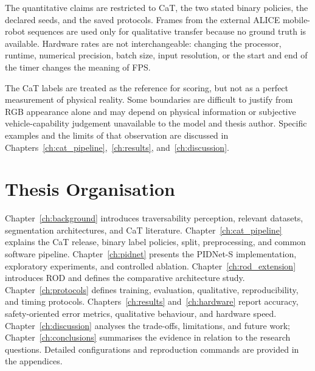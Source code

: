 The quantitative claims are restricted to CaT, the two stated binary policies,
the declared seeds, and the saved protocols. Frames from the external ALICE
mobile-robot sequences are used only for qualitative transfer because no
ground truth is available. Hardware rates are not interchangeable: changing
the processor, runtime, numerical precision, batch size, input resolution, or
the start and end of the timer changes the meaning of FPS.

The CaT labels are treated as the reference for scoring, but not as a perfect
measurement of physical reality. Some boundaries are difficult to justify
from RGB appearance alone and may depend on physical information or subjective
vehicle-capability judgement unavailable to the model and thesis author.
Specific examples and the limits of that observation are discussed in
Chapters~\ref{ch:cat_pipeline},~\ref{ch:results}, and~\ref{ch:discussion}.

\section{Thesis Organisation}

Chapter~\ref{ch:background} introduces traversability perception, relevant
datasets, segmentation architectures, and CaT literature.
Chapter~\ref{ch:cat_pipeline} explains the CaT release, binary label policies,
split, preprocessing, and common software pipeline.
Chapter~\ref{ch:pidnet} presents the PIDNet-S implementation, exploratory
experiments, and controlled ablation.
Chapter~\ref{ch:rod_extension} introduces ROD and defines the comparative
architecture study.
Chapter~\ref{ch:protocols} defines training, evaluation, qualitative,
reproducibility, and timing protocols.
Chapters~\ref{ch:results} and~\ref{ch:hardware} report accuracy,
safety-oriented error metrics,
qualitative behaviour, and hardware speed.
Chapter~\ref{ch:discussion} analyses the trade-offs, limitations, and future
work; Chapter~\ref{ch:conclusions} summarises the evidence in relation to the
research questions.
Detailed configurations and reproduction commands are provided in the
appendices.
